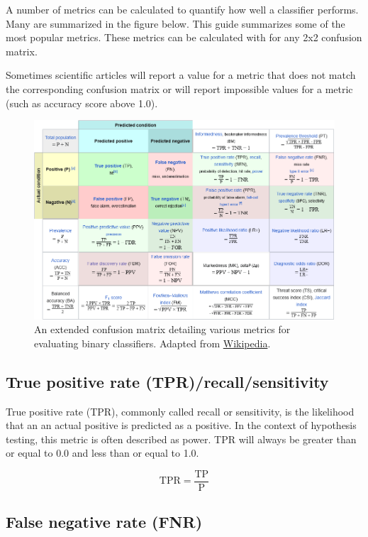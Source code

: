 \documentclass[letterpaper, 12pt]{article}
\begin{document}
A number of metrics can be calculated to quantify how well a classifier performs. Many are summarized in the figure below. This guide summarizes some of the most popular metrics. These metrics can be calculated with for any 2x2 confusion matrix. 

Sometimes scientific articles will report a value for a metric that does not match the corresponding confusion matrix or will report impossible values for a metric (such as accuracy score above 1.0).

\begin{figure}[h!tbp]
    \centering
    \includegraphics[width=\textwidth]{img/classifier_eval/extended_confusion_matrix.png}
    \caption*{An extended confusion matrix detailing various metrics for evaluating binary classifiers. Adapted from \href{https://en.wikipedia.org/wiki/Evaluation_of_binary_classifiers}{Wikipedia}.}
\end{figure}

\pagebreak

\subsection*{True positive rate (TPR)/recall/sensitivity}

True positive rate (TPR), commonly called recall or sensitivity, is the likelihood that an an actual positive is predicted as a positive. In the context of hypothesis testing, this metric is often described as power. TPR will always be greater than or equal to 0.0 and less than or equal to 1.0.

$$\textrm{TPR} = \frac{\textrm{TP}}{\textrm{P}}$$

\subsection*{False negative rate (FNR)}
\end{document}

